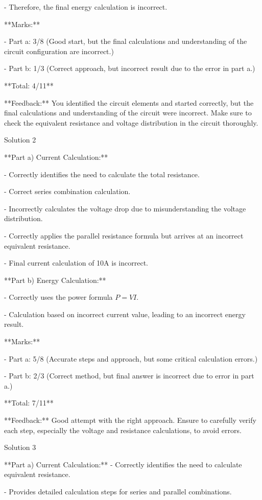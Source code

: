 \documentclass[a4paper,11pt]{article}
\begin{document}
- Therefore, the final energy calculation is incorrect.

**Marks:**

- Part a: 3/8 (Good start, but the final calculations and understanding of the circuit configuration are incorrect.)

- Part b: 1/3 (Correct approach, but incorrect result due to the error in part a.)

**Total: 4/11**

**Feedback:** You identified the circuit elements and started correctly, but the final calculations and understanding of the circuit were incorrect. Make sure to check the equivalent resistance and voltage distribution in the circuit thoroughly.

Solution 2

**Part a) Current Calculation:**

- Correctly identifies the need to calculate the total resistance.

- Correct series combination calculation.

- Incorrectly calculates the voltage drop due to misunderstanding the voltage distribution.

- Correctly applies the parallel resistance formula but arrives at an incorrect equivalent resistance.

- Final current calculation of 10A is incorrect.

**Part b) Energy Calculation:**

- Correctly uses the power formula \( P = VI \).

- Calculation based on incorrect current value, leading to an incorrect energy result.

**Marks:**

- Part a: 5/8 (Accurate steps and approach, but some critical calculation errors.)

- Part b: 2/3 (Correct method, but final answer is incorrect due to error in part a.)

**Total: 7/11**

**Feedback:** Good attempt with the right approach. Ensure to carefully verify each step, especially the voltage and resistance calculations, to avoid errors.

Solution 3

**Part a) Current Calculation:**
- Correctly identifies the need to calculate equivalent resistance.

- Provides detailed calculation steps for series and parallel combinations.
\end{document}
